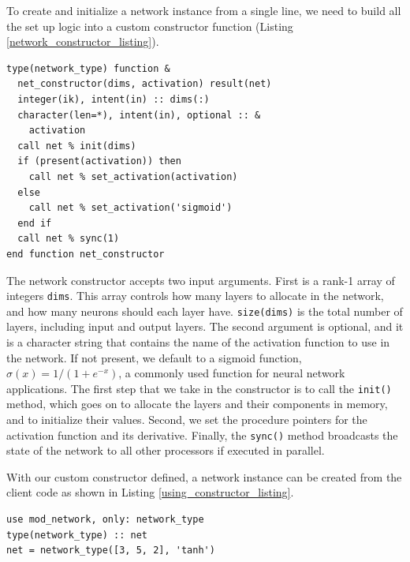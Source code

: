 \documentclass[sigplan, review=false, screen=true, balance=true]{acmart}
\begin{document}
To create and initialize a network instance from a single line, we need to
build all the set up logic into a custom constructor function (Listing
\ref{network_constructor_listing}).

\begin{minipage}{\linewidth}
\begin{lstlisting}[caption={Custom network constructor.}, captionpos=b, label={network_constructor_listing}]
type(network_type) function &
  net_constructor(dims, activation) result(net)
  integer(ik), intent(in) :: dims(:)
  character(len=*), intent(in), optional :: &
    activation
  call net % init(dims)
  if (present(activation)) then
    call net % set_activation(activation)
  else
    call net % set_activation('sigmoid')
  end if
  call net % sync(1)
end function net_constructor
\end{lstlisting}
\end{minipage}

The network constructor accepts two input arguments. First is a rank-1 array of
integers \lstinline{dims}. This array controls how many layers to allocate in
the network, and how many neurons should each layer have. \lstinline{size(dims)}
is the total number of layers, including input and output layers. The second
argument is optional, and it is a character string that contains the name of the
activation function to use in the network. If not present, we default to a
sigmoid function, $\sigma(x) = 1 / \left( 1 + e^{-x} \right)$,
a commonly used function for neural network applications.
The first step that we take in the constructor is to call the \lstinline{init()} method,
which goes on to allocate the layers and their components in memory, and to
initialize their values. Second, we set the procedure pointers for the activation
function and its derivative. Finally, the \lstinline{sync()} method broadcasts
the state of the network to all other processors if executed in parallel.

With our custom constructor defined, a network instance can be created from the
client code as shown in Listing \ref{using_constructor_listing}.

\begin{minipage}{\linewidth}
\begin{lstlisting}[caption={Creating a network instance in the client code.}, captionpos=b, label={using_constructor_listing}]
use mod_network, only: network_type
type(network_type) :: net
net = network_type([3, 5, 2], 'tanh')
\end{lstlisting}
\end{minipage}
\end{document}
